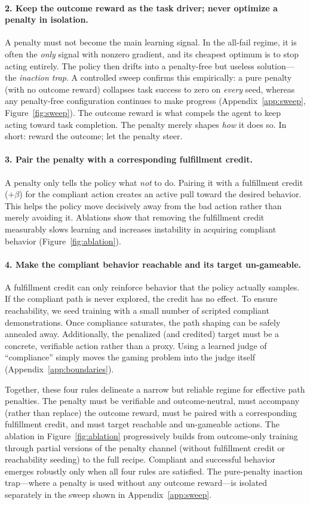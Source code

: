 \paragraph{2. Keep the outcome reward as the task driver; never optimize a penalty in isolation.} A penalty must not become the main learning signal. In the all-fail regime, it is often the \emph{only} signal with nonzero gradient, and its cheapest optimum is to stop acting entirely. The policy then drifts into a penalty-free but useless solution---the \emph{inaction trap}. A controlled sweep confirms this empirically: a pure penalty (with no outcome reward) collapses task success to zero on \emph{every} seed, whereas any penalty-free configuration continues to make progress (Appendix~\ref{app:sweep}, Figure~\ref{fig:sweep}). The outcome reward is what compels the agent to keep acting toward task completion. The penalty merely shapes \emph{how} it does so. In short: reward the outcome; let the penalty steer.

\paragraph{3. Pair the penalty with a corresponding fulfillment credit.} A penalty only tells the policy what \emph{not} to do. Pairing it with a fulfillment credit ($+\beta$) for the compliant action creates an active pull toward the desired behavior. This helps the policy move decisively away from the bad action rather than merely avoiding it. Ablations show that removing the fulfillment credit measurably slows learning and increases instability in acquiring compliant behavior (Figure~\ref{fig:ablation}).

\paragraph{4. Make the compliant behavior reachable and its target un-gameable.} A fulfillment credit can only reinforce behavior that the policy actually samples. If the compliant path is never explored, the credit has no effect. To ensure reachability, we seed training with a small number of scripted compliant demonstrations. Once compliance saturates, the path shaping can be safely annealed away. Additionally, the penalized (and credited) target must be a concrete, verifiable action rather than a proxy. Using a learned judge of ``compliance'' simply moves the gaming problem into the judge itself (Appendix~\ref{app:boundaries}).

Together, these four rules delineate a narrow but reliable regime for effective path penalties. The penalty must be verifiable and outcome-neutral, must accompany (rather than replace) the outcome reward, must be paired with a corresponding fulfillment credit, and must target reachable and un-gameable actions. The ablation in Figure~\ref{fig:ablation} progressively builds from outcome-only training through partial versions of the penalty channel (without fulfillment credit or reachability seeding) to the full recipe. Compliant and successful behavior emerges robustly only when all four rules are satisfied. The pure-penalty inaction trap---where a penalty is used without any outcome reward---is isolated separately in the sweep shown in Appendix~\ref{app:sweep}.

